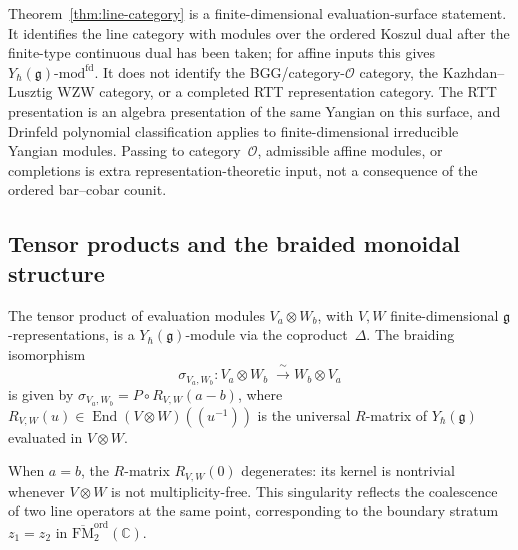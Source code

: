 \begin{remark}
\label{rem:line-category-fd-category-o-rtt}
Theorem~\ref{thm:line-category} is a finite-dimensional
evaluation-surface statement. It identifies the line category with
modules over the ordered Koszul dual after the finite-type continuous
dual has been taken; for affine inputs this gives
$Y_\hbar(\mathfrak g)\text{-}\mathrm{mod}^{\mathrm{fd}}$.
It does not identify the BGG/category-$\mathcal O$ category, the
Kazhdan--Lusztig WZW category, or a completed RTT representation
category. The RTT presentation is an algebra presentation of the same
Yangian on this surface, and Drinfeld polynomial classification applies
to finite-dimensional irreducible Yangian modules. Passing to
category~$\mathcal O$, admissible affine modules, or completions is
extra representation-theoretic input, not a consequence of the
ordered bar--cobar counit.
\end{remark}

\subsection{Tensor products and the braided monoidal structure}

\begin{theorem}
\label{thm:eval-braiding}
The tensor product of evaluation modules $V_a\otimes W_b$,
with $V,W$ finite-dimensional $\mathfrak{g}$-representations,
is a $Y_\hbar(\mathfrak{g})$-module via the coproduct~$\Delta$.
The braiding isomorphism
\[
\sigma_{V_a,W_b}\colon
V_a\otimes W_b
\;\xrightarrow{\;\sim\;}
W_b\otimes V_a
\]
is given by $\sigma_{V_a,W_b}=P\circ R_{V,W}(a-b)$,
where $R_{V,W}(u)\in\operatorname{End}(V\otimes W)(\!(u^{-1})\!)$
is the universal $R$-matrix of $Y_\hbar(\mathfrak{g})$
evaluated in $V\otimes W$.

When $a=b$, the $R$-matrix $R_{V,W}(0)$ degenerates:
its kernel is nontrivial whenever $V\otimes W$ is not
multiplicity-free. This singularity reflects the
coalescence of two line operators at the same point,
corresponding to the boundary stratum
$z_1=z_2$ in $\overline{\mathrm{FM}}_2^{\mathrm{ord}}(\mathbb{C})$.
\end{theorem}

